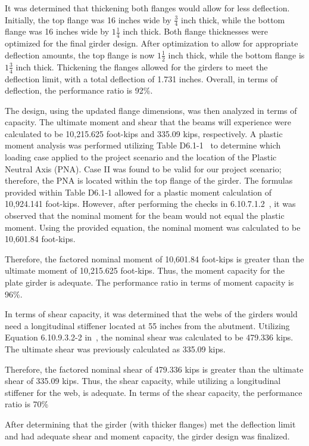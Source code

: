 It was determined that thickening both flanges would allow for less deflection. Initially, the top flange was 16 inches wide by \(\frac{3}{4}\) inch thick, while the bottom flange was 16 inches wide by \(1\frac{1}{4}\) inch thick. Both flange thicknesses were optimized for the final girder design. After optimization to allow for appropriate deflection amounts, the top flange is now \(1\frac{1}{2}\) inch thick, while the bottom flange is \(1\frac{3}{4}\) inch thick. Thickening the flanges allowed for the girders to meet the deflection limit, with a total deflection of 1.731 inches. Overall, in terms of deflection, the performance ratio is 92\%.

The design, using the updated flange dimensions, was then analyzed in terms of capacity. The ultimate moment and shear that the beams will experience were calculated to be 10,215.625 foot-kips and 335.09 kips, respectively. A plastic moment analysis was performed utilizing Table D6.1-1~\cite{aashto7} to determine which loading case applied to the project scenario and the location of the Plastic Neutral Axis (PNA). Case II was found to be valid for our project scenario; therefore, the PNA is located within the top flange of the girder. The formulas provided within Table D6.1-1\cite{aashto7} allowed for a plastic moment calculation of 10,924.141 foot-kips. However, after performing the checks in 6.10.7.1.2~\cite{aashto7}, it was observed that the nominal moment for the beam would not equal the plastic moment. Using the provided equation, the nominal moment was calculated to be 10,601.84 foot-kips.

Therefore, the factored nominal moment of 10,601.84 foot-kips is greater than the ultimate moment of 10,215.625 foot-kips. Thus, the moment capacity for the plate girder is adequate. The performance ratio in terms of moment capacity is 96\%.

In terms of shear capacity, it was determined that the webs of the girders would need a longitudinal stiffener located at 55 inches from the abutment. Utilizing Equation 6.10.9.3.2-2 in~\cite{aashto7}, the nominal shear was calculated to be 479.336 kips. The ultimate shear was previously calculated as 335.09 kips.

Therefore, the factored nominal shear of 479.336 kips is greater than the ultimate shear of 335.09 kips. Thus, the shear capacity, while utilizing a longitudinal stiffener for the web, is adequate. In terms of the shear capacity, the performance ratio is 70\%

After determining that the girder (with thicker flanges) met the deflection limit and had adequate shear and moment capacity, the girder design was finalized.

